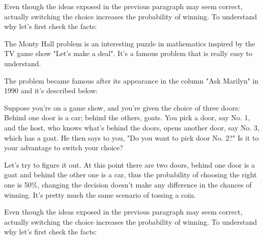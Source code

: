 Even though the ideas exposed in the previous paragraph may seem correct, actually 
switching the choice increases the probability of winning. To understand why let's 
first check the facts:

The Monty Hall problem is an interesting puzzle in mathematics inspired by the TV 
game show "Let's make a deal". It's a famous problem that is really easy to understand.

The problem became famous after its appearance in the column "Ask Marilyn" in 1990 and 
it's described below:

Suppose you're on a game show, and you're given the choice of three doors: Behind one 
door is a car; behind the others, goats. You pick a door, say No. 1, and the host, who 
knows what's behind the doors, opens another door, say No. 3, which has a goat. He then 
says to you, "Do you want to pick door No. 2?" Is it to your advantage to switch your
choice?


Let's try to figure it out. At this point there are two doors, behind one door is a goat 
and behind the other one is a car, thus the probability of choosing the right one is 50\%,
changing the decision doesn't make any difference in the chances of winning. It's pretty
much the same scenario of tossing a coin.

Even though the ideas exposed in the previous paragraph may seem correct, actually 
switching the choice increases the probability of winning. To understand why let's 
first check the facts:

\blindtext

